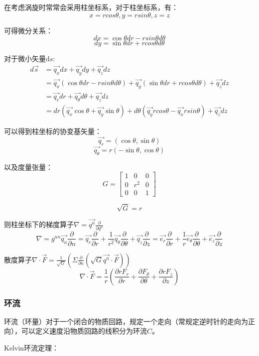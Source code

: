 \documentclass{article}
\begin{document}
在考虑涡旋时常常会采用柱坐标系，对于柱坐标系，有：
$$x=rcos\theta, y=rsin\theta,z=z$$

可得微分关系：
$$dx = \cos\theta dr - rsin\theta d\theta$$
$$dy = \sin\theta dr + rcos\theta d\theta$$

对于微小矢量$\text{d} s$:
\begin{align}
d\vec{s} &= \vec{q_x}dx + \vec{q_y}dy + \vec{q_z}dz \\ 
         &= \vec{q_x}(\cos\theta dr - rsin\theta d\theta) + \vec{q_y}(\sin\theta dr + rcos\theta d\theta) + \vec{q_z}dz \\
         &= \vec{q_r}dr + \vec{q_\theta}d\theta + \vec{q_z}dz\\
         &= dr(\vec{q_x}\cos\theta+\vec{q_y}\sin\theta) + d\theta(\vec{q_y}rcos\theta-\vec{q_x}rsin\theta)+\vec{q_z}dz
\end{align}

可以得到柱坐标的协变基矢量：
$$\vec{q_r} = (\cos\theta, \sin\theta)$$
$$\vec{q_\theta} = r(-\sin\theta, \cos\theta)$$

以及度量张量：
$$G=\begin{bmatrix}
    1&0&0 \\
    0&r^2&0 \\
    0&0&1
\end{bmatrix}$$

$$\sqrt{G} = r$$

则柱坐标下的梯度算子$\nabla = \vec{q^n}\frac{\partial}{\partial q^n}$
$$\nabla=g^{nn}\vec{q_n}\frac{\partial}{\partial n}=\vec{q_r}\frac{\partial}{\partial r}+\frac{1}{r^2}\vec{q_\theta}\frac{\partial}{\partial \theta}+\vec{q_z}\frac{\partial}{\partial z}=\vec{e_r}\frac{\partial}{\partial r}+\frac{1}{r}\vec{e_\theta}\frac{\partial}{\partial \theta}+\vec{e_z}\frac{\partial}{\partial z}$$

散度算子$\nabla\cdot\vec{F} = \frac{1}{\sqrt{G}}\left(\Sigma\frac{\partial}{\partial n}(\sqrt{G}\vec{q^n}\cdot\vec{F})\right)$
$$\nabla\cdot\vec{F}= \frac{1}{r}(\frac{\partial rF_r}{\partial r}+\frac{\partial F_\theta}{\partial \theta}+\frac{\partial rF_z}{\partial z})$$



\subsubsection{环流}
环流（环量）对于一个闭合的物质回路，规定一个走向（常规定逆时针的走向为正向），可以定义速度沿物质回路的线积分为环流$C$。

Kelvin环流定理：
\end{document}
